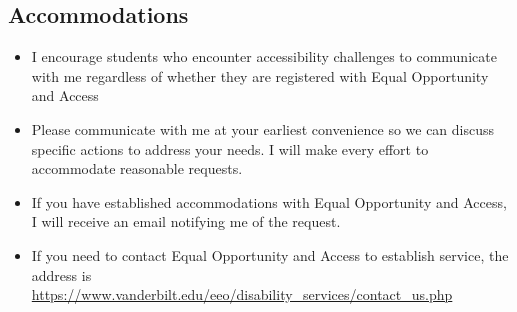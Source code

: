 \documentclass[
  letterpaper,
  DIV=11,
  numbers=noendperiod]{scrartcl}
\begin{document}
\hypertarget{accommodations}{%
\subsection{Accommodations}\label{accommodations}}

\begin{itemize}
\item
  I encourage students who encounter accessibility challenges to
  communicate with me regardless of whether they are registered with
  Equal Opportunity and Access
\item
  Please communicate with me at your earliest convenience so we can
  discuss specific actions to address your needs. I will make every
  effort to accommodate reasonable requests.
\item
  If you have established accommodations with Equal Opportunity and
  Access, I will receive an email notifying me of the request.
\item
  If you need to contact Equal Opportunity and Access to establish
  service, the address is
  \url{https://www.vanderbilt.edu/eeo/disability_services/contact_us.php}
\end{itemize}
\end{document}
